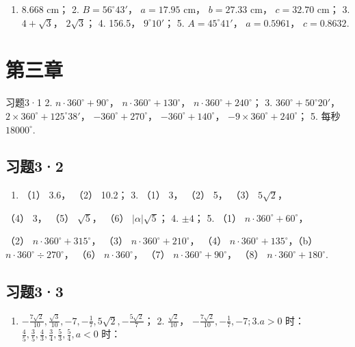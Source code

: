 \begin{enumerate}
\item
  8.668 cm； 2. \(B = 56^{\circ}43'\)， \(a = 17.95\) cm， \(b = 27.33\)
  cm， \(c = 32.70\) cm； 3. \(4 + \sqrt{3}\)， \(2\sqrt{3}\)； 4.
  156.5， \(9^{\circ}10'\)； 5. \(A = 45^{\circ}41'\)， \(a = 0.5961\)，
  \(c = 0.8632\).
\end{enumerate}

\section{第三章}

习题3·1 2. \(n \cdot 360^{\circ} + 90^{\circ}\)，
\(n \cdot 360^{\circ} + 130^{\circ}\)，
\(n \cdot 360^{\circ} + 240^{\circ}\)； 3.
\(360^{\circ} + 50^{\circ}20'\)，
\(2 \times 360^{\circ} + 125^{\circ}38'\)，
\(-360^{\circ} + 270^{\circ}\)， \(-360^{\circ} + 140^{\circ}\)，
\(-9 \times 360^{\circ} + 240^{\circ}\)； 5. 每秒 \(18000^{\circ}\).

\subsection{习题3·2}

\begin{enumerate}[start=2]
\item
  （1） 3.6， （2） 10.2； 3. （1） 3， （2） 5， （3） \(5\sqrt{2}\)，
\end{enumerate}

（4） 3， （5） \(\sqrt{5}\)， （6） \(|\alpha| \sqrt{5}\)； 4.
\(\pm 4\)； 5. （1） \(n \cdot 360^\circ + 60^\circ\)，

（2） \(n \cdot 360^{\circ} + 315^{\circ}\)， （3）
\(n \cdot 360^{\circ} + 210^{\circ}\)， （4）
\(n \cdot 360^{\circ} + 135^{\circ}\)，（b）
\(n \cdot 360^{\circ} \div 270^{\circ}\)， （6）
\(n \cdot 360^{\circ}\)， （7） \(n \cdot 360^{\circ} + 90^{\circ}\)，
（8） \(n \cdot 360^{\circ} + 180^{\circ}\).

\subsection{习题3·3}

\begin{enumerate}
\item
  \(-\frac{7\sqrt{2}}{10}, \frac{\sqrt{3}}{10}, -7, -\frac{1}{7}, 5\sqrt{2}, -\frac{5\sqrt{2}}{7}\)；
  2. \(\frac{\sqrt{2}}{10}\)，
  \(-\frac{7\sqrt{2}}{10}, -\frac{1}{7}, -7; 3. a > 0\)
  时：\(\frac{4}{5}, \frac{3}{5}, \frac{4}{3}, \frac{3}{4}, \frac{5}{3}, \frac{5}{4}, a < 0\)
  时：
\end{enumerate}

